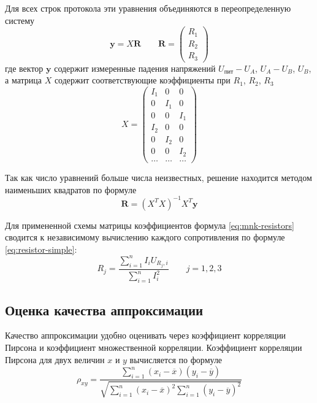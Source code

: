 \documentclass[12pt,a4paper]{article}
\begin{document}
Для всех строк протокола эти уравнения объединяются в переопределенную
систему
\begin{equation*}
\mathbf{y} = X\mathbf{R}
\qquad
\mathbf{R} =
\begin{pmatrix}
R_1\\R_2\\R_3
\end{pmatrix}
\end{equation*}
где вектор $\mathbf{y}$ содержит измеренные падения напряжений
$U_{\text{пит}} - U_A$, $U_A - U_B$, $U_B$, а матрица $X$ содержит
соответствующие коэффициенты при $R_1$, $R_2$, $R_3$
\begin{equation*}
X =
\begin{pmatrix}
I_1 & 0 & 0\\
0 & I_1 & 0\\
0 & 0 & I_1\\
I_2 & 0 & 0\\
0 & I_2 & 0\\
0 & 0 & I_2\\
\ldots & \ldots & \ldots
\end{pmatrix}
\end{equation*}

Так как число уравнений больше числа неизвестных, решение находится методом
наименьших квадратов по формуле
\begin{equation}
\mathbf{R} = \left(X^TX\right)^{-1}X^T\mathbf{y}
\tag{5.2}
\label{eq:mnk-resistors}
\end{equation}

Для примененной схемы матрицы коэффициентов формула \eqref{eq:mnk-resistors}
сводится к независимому вычислению каждого сопротивления по формуле \eqref{eq:resistor-simple}:
\begin{equation}
R_j =
\frac{\sum\limits_{i = 1}^{n} I_i U_{R_j,i}}
{\sum\limits_{i = 1}^{n} I_i^2}
\qquad j = 1,2,3
\tag{5.3}
\label{eq:resistor-simple}
\end{equation}

\subsection{Оценка качества аппроксимации}

Качество аппроксимации удобно оценивать через коэффициент корреляции
Пирсона и коэффициент множественной корреляции. Коэффициент корреляции
Пирсона для двух величин $x$ и $y$ вычисляется по формуле 
\begin{equation}
\rho_{xy} =
\frac{\sum\limits_{i = 1}^{n}(x_i - \overline{x})(y_i - \overline{y})}
{\sqrt{\sum\limits_{i = 1}^{n}(x_i - \overline{x})^2\sum\limits_{i = 1}^{n}(y_i - \overline{y})^2}}
\tag{6.1}
\label{eq:pearson}
\end{equation}
\end{document}
